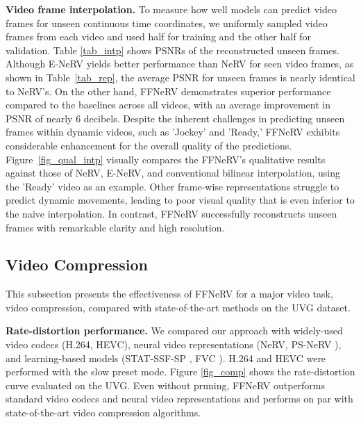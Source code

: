 \documentclass[sigconf]{acmart}
\begin{document}
\noindent\textbf{Video frame interpolation.}
To measure how well models can predict video frames for unseen continuous time coordinates, we uniformly sampled video frames from each video and used half for training and the other half for validation.
Table \ref{tab_intp} shows PSNRs of the reconstructed unseen frames.
Although E-NeRV yields better performance than NeRV for seen video frames, as shown in Table~\ref{tab_rep}, the average PSNR for unseen frames is nearly identical to NeRV's.
On the other hand, FFNeRV demonstrates superior performance compared to the baselines across all videos, with an average improvement in PSNR of nearly 6 decibels.
Despite the inherent challenges in predicting unseen frames within dynamic videos, such as 'Jockey' and 'Ready,' FFNeRV exhibits considerable enhancement for the overall quality of the predictions.
Figure~\ref{fig_qual_intp} visually compares the FFNeRV's qualitative results against those of NeRV, E-NeRV, and conventional bilinear interpolation, using the 'Ready' video as an example.
Other frame-wise representations struggle to predict dynamic movements, leading to poor visual quality that is even inferior to the naive interpolation. 
In contrast, FFNeRV successfully reconstructs unseen frames with remarkable clarity and high resolution.

\subsection{Video Compression}
This subsection presents the effectiveness of FFNeRV for a major video task, video compression, compared with state-of-the-art methods on the UVG dataset.


\noindent\textbf{Rate-distortion performance.} We compared our approach with widely-used video codecs (H.264, HEVC), neural video representations (NeRV, PS-NeRV \cite{psnerv}), and learning-based models (STAT-SSF-SP \cite{statssfsp}, FVC \cite{fvc}).
H.264 and HEVC were performed with the slow preset mode.
Figure \ref{fig_comp} shows the rate-distortion curve evaluated on the UVG.
Even without pruning, FFNeRV outperforms standard video codecs and neural video representations and performs on par with state-of-the-art video compression algorithms.
\end{document}
